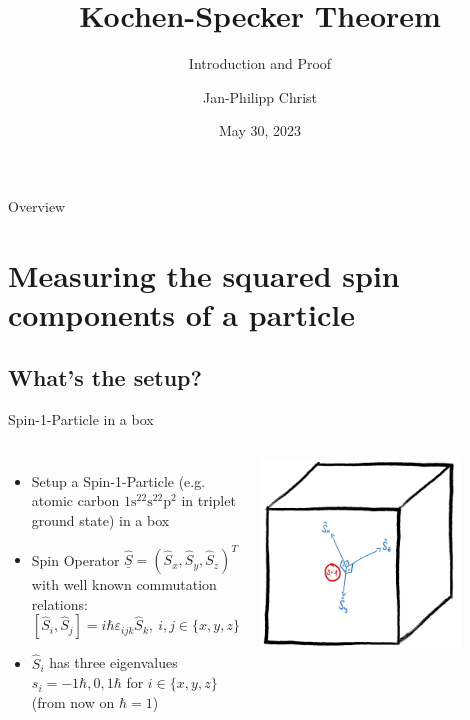 \documentclass{beamer}
\title{Kochen-Specker Theorem}
\subtitle{Introduction and Proof}
\date{May 30, 2023}
\author{Jan-Philipp Christ}
\institute{LMU Munich}
\begin{document}
\maketitle
\setwatermark{}
\begin{frame}{Overview}
\tableofcontents
\end{frame}

\section{Measuring the squared spin components of a particle}
\subsection{What's the setup?}
\begin{frame}{Spin-1-Particle in a box}
  \begin{columns}
      \begin{itemize}
	\item Setup a Spin-1-Particle (e.g. atomic carbon $1\mathrm s^22\mathrm s^22\mathrm p^2$ in triplet ground state) in a box
	\item Spin Operator $\underline{\hat S}=(\hat S_x,\hat S_y, \hat S_z)^{ T}$
		with well known commutation relations:\\
$[\hat S_i,\hat S_j]=i\hbar\varepsilon_{ijk}\hat S_k,\ i,j\in\{x,y,z\}$
	\item $\hat S_i$ has three eigenvalues $s_i=-1\hbar,0,1\hbar$ for $ i\in\{x,y,z\}$
		(from now on $\hbar=1$)
       \end{itemize}

\begin{flushright}
     \includegraphics[width=0.8\textwidth]{box.jpg}
\end{flushright}
  \end{columns}
\end{frame}
\end{document}

